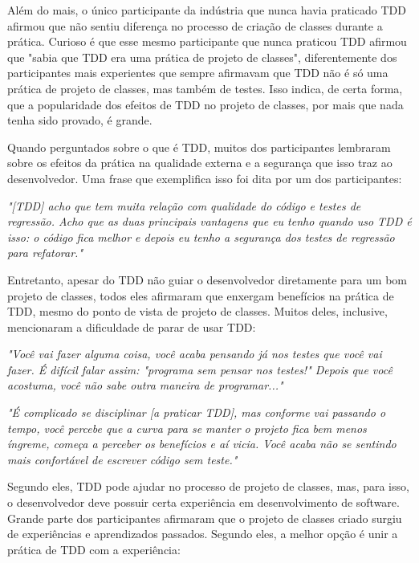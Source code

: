Além do mais, o único participante da indústria que nunca havia
praticado TDD afirmou que não sentiu diferença no processo de criação de classes durante
a prática.
Curioso é que esse mesmo participante que nunca praticou TDD afirmou que "sabia que TDD era uma prática de projeto de classes",
diferentemente dos participantes mais experientes que sempre afirmavam que TDD não é só uma prática de projeto de classes,
mas também de testes. Isso indica, de certa forma, que a popularidade dos efeitos de TDD no projeto de classes, por mais
que nada tenha sido provado, é grande.

Quando perguntados sobre o que é TDD, muitos dos participantes lembraram sobre
os efeitos da prática na qualidade externa e a segurança que isso traz
ao desenvolvedor.
Uma frase que exemplifica isso foi dita por um dos participantes:

\begin{framed}
\textit{"[TDD] acho que tem muita relação com qualidade do código e testes 
de regressão. Acho que as duas principais vantagens que eu tenho quando uso TDD é isso: o código
fica melhor e depois eu tenho a segurança dos testes de regressão para refatorar."}
\end{framed}

Entretanto, apesar do TDD não guiar o desenvolvedor diretamente para um bom projeto de classes,
todos eles afirmaram que enxergam benefícios na prática de TDD, mesmo do
ponto de vista de projeto de classes. Muitos deles, inclusive, mencionaram a dificuldade
de parar de usar TDD:

\begin{framed}
\textit{"Você vai fazer alguma coisa, você acaba pensando já nos testes que você vai fazer. É difícil 
falar assim: "programa sem pensar nos testes!" Depois que você acostuma, você não sabe outra
maneira de programar..."}
\end{framed}

\begin{framed}
\textit{"É complicado se disciplinar [a praticar TDD], mas conforme vai passando o tempo, 
você percebe que a curva para se manter o projeto fica bem menos íngreme, 
começa a perceber os benefícios e aí vicia. Você acaba não se sentindo
mais confortável de escrever código sem teste."}
\end{framed}

Segundo eles, TDD pode ajudar no processo de projeto de classes, mas, para isso,
o desenvolvedor deve possuir certa experiência em desenvolvimento de software. 
Grande parte dos participantes afirmaram que o 
projeto de classes criado surgiu de experiências e aprendizados passados.
Segundo eles, a melhor opção é unir a prática de TDD com a experiência:

